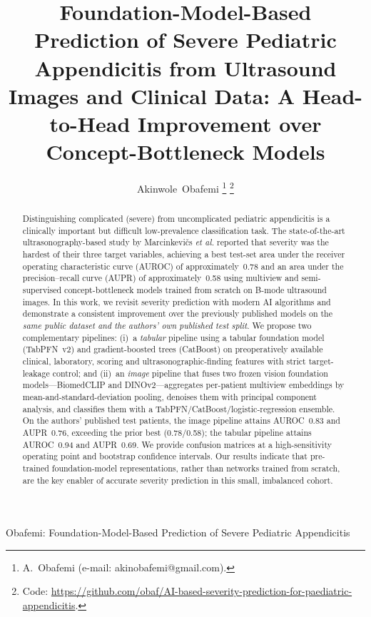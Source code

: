 \documentclass[journal]{IEEEtran}
\begin{document}
\title{Foundation-Model-Based Prediction of Severe Pediatric Appendicitis from
Ultrasound Images and Clinical Data: A Head-to-Head Improvement over
Concept-Bottleneck Models}

\author{Akinwole~Obafemi%
\thanks{A.~Obafemi (e-mail: akinobafemi@gmail.com).}%
\thanks{Code: \protect\url{https://github.com/obaf/AI-based-severity-prediction-for-paediatric-appendicitis}.}}

%
{Obafemi: Foundation-Model-Based Prediction of Severe Pediatric Appendicitis}

\maketitle

\begin{abstract}
Distinguishing complicated (severe) from uncomplicated pediatric appendicitis is a
clinically important but difficult low-prevalence classification task. The
state-of-the-art ultrasonography-based study by Marcinkevi\v{c}s \emph{et al.}
reported that severity was the hardest of their three target variables, achieving a
best test-set area under the receiver operating characteristic curve (AUROC) of
approximately~0.78 and an area under the precision--recall curve (AUPR) of
approximately~0.58 using multiview and semi-supervised concept-bottleneck models
trained from scratch on B-mode ultrasound images. In this work, we revisit
severity prediction with modern AI algorithms and demonstrate a consistent
improvement over the previously published models on the \emph{same public dataset
and the authors' own published test split}. We propose two complementary pipelines:
(i)~a \emph{tabular} pipeline using a tabular foundation model (TabPFN~v2) and
gradient-boosted trees (CatBoost) on preoperatively available clinical, laboratory,
scoring and ultrasonographic-finding features with strict target-leakage control;
and (ii)~an \emph{image} pipeline that fuses two frozen vision foundation
models---BiomedCLIP and DINOv2---aggregates per-patient multiview embeddings by
mean-and-standard-deviation pooling, denoises them with principal component
analysis, and classifies them with a TabPFN/CatBoost/logistic-regression ensemble.
On the authors' published test patients, the image pipeline attains AUROC~0.83 and
AUPR~0.76, exceeding the prior best (0.78/0.58); the tabular pipeline attains
AUROC~0.94 and AUPR~0.69. We provide confusion matrices at a high-sensitivity
operating point and bootstrap confidence intervals. Our results indicate that
pre-trained foundation-model representations, rather than networks trained from
scratch, are the key enabler of accurate severity prediction in this small,
imbalanced cohort.
\end{abstract}
\end{document}

